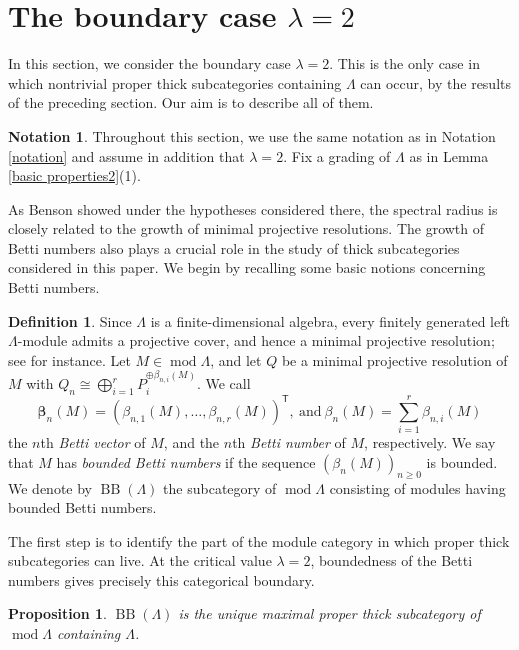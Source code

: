 \documentclass{amsart}
\newtheorem{prop}[thm]{Proposition}
\theoremstyle{definition}
\newtheorem{dfn}[thm]{Definition}
\newtheorem{nota}[thm]{Notation}
\theoremstyle{remark}
\numberwithin{equation}{thm}
\def\BB{\operatorname{BB}}
\def\L{\Lambda}
\def\ge{\geqslant}
\def\mod{\operatorname{mod}}
\def\T{\mathsf{T}}
\begin{document}
\section{The boundary case $\lambda=2$}

In this section, we consider the boundary case $\lambda=2$. This is the only case in which nontrivial proper thick subcategories containing $\L$ can occur, by the results of the preceding section. Our aim is to describe all of them.

\begin{nota}
Throughout this section, we use the same notation as in Notation \ref{notation} and assume in addition that $\lambda=2$. Fix a grading of $\L$ as in Lemma \ref{basic properties2}(1).
\end{nota}

As Benson \cite{Ben} showed under the hypotheses considered there, the spectral radius is closely related to the growth of minimal projective resolutions. The growth of Betti numbers also plays a crucial role in the study of thick subcategories considered in this paper. We begin by recalling some basic notions concerning Betti numbers.

\begin{dfn}
Since $\L$ is a finite-dimensional algebra, every finitely generated
left $\L$-module admits a projective cover, and hence a minimal projective
resolution; see \cite[Section 4]{I} for instance.
Let $M\in\mod\L$, and let $Q$ be a minimal projective resolution of $M$ with $Q_n\cong\bigoplus_{i=1}^rP_i^{\oplus\beta_{n,i}(M)}$.
We call
$$
\boldsymbol{\beta}_n(M)=(\beta_{n,1}(M),\ldots,\beta_{n,r}(M))^{\T}, \ \text{and} \ \beta_n(M)=\sum_{i=1}^r\beta_{n,i}(M)
$$
the $n$th \textit{Betti vector} of $M$, and the $n$th \textit{Betti number} of $M$, respectively.
We say that $M$ has \textit{bounded Betti numbers} if the sequence $(\beta_n(M))_{n\ge0}$ is bounded. We denote by $\BB(\L)$ the subcategory of $\mod\L$ consisting of modules having bounded Betti numbers.
\end{dfn}

The first step is to identify the part of the module category in which proper thick subcategories can live. At the critical value $\lambda=2$, boundedness of the Betti numbers gives precisely this categorical boundary.

\begin{prop}\label{bounded betti thick}
$\BB(\L)$ is the unique maximal proper thick subcategory of $\mod\L$ containing $\L$.
\end{prop}
\end{document}
